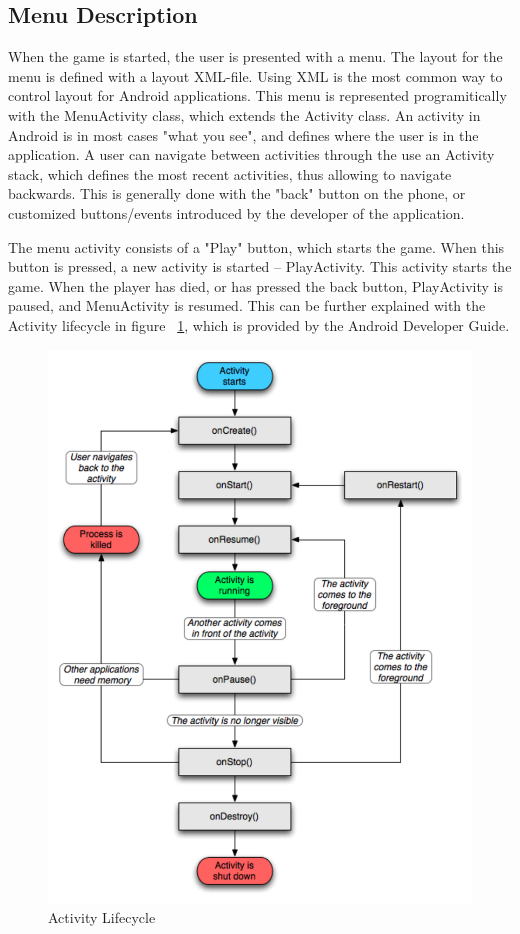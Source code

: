 

\subsection{Menu Description}
When the game is started, the user is presented with a menu. The layout for the menu is defined with a layout XML-file. Using XML is the most common way to control layout for Android applications.\cite{android:ui} This menu is represented programitically with the MenuActivity class, which extends the Activity class. An activity in Android is in most cases "what you see", and defines where the user is in the application. A user can navigate between activities through the use an Activity stack, which defines the most recent activities, thus allowing to navigate backwards. This is generally done with the "back" button on the phone, or customized buttons/events introduced by the developer of the application.\cite{android:activity}

The menu activity consists of a "Play" button, which starts the game. When this button is pressed, a new activity is started -- PlayActivity. This activity starts the game. When the player has died, or has pressed the back button, PlayActivity is paused, and MenuActivity is resumed. This can be further explained with the Activity lifecycle in figure ~\ref{fig:activityLifecycle}, which is provided by the Android Developer Guide.


\begin{figure} [h]
	\center
		\includegraphics[scale=0.5]{main/figures/activity_lifecycle}
		\caption{Activity Lifecycle\cite{android:activity}}
		\label{fig:activityLifecycle}
\end{figure}

